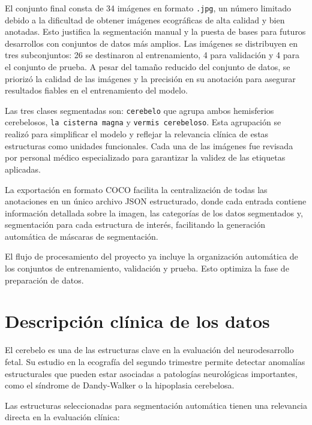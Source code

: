 El conjunto final consta de 34 imágenes en formato \texttt{.jpg}, un número limitado debido a la dificultad de obtener imágenes ecográficas de alta calidad y bien anotadas. Esto justifica la segmentación manual y la puesta de bases para futuros desarrollos con conjuntos de datos más amplios. Las imágenes se distribuyen en tres subconjuntos: 26 se destinaron al entrenamiento, 4 para validación y 4 para el conjunto de prueba. A pesar del tamaño reducido del conjunto de datos, se priorizó la calidad de las imágenes y la precisión en su anotación para asegurar resultados fiables en el entrenamiento del modelo.

Las tres clases segmentadas son: \texttt{cerebelo} que agrupa ambos hemisferios cerebelosos, \texttt{la cisterna magna} y \texttt{vermis cerebeloso}. Esta agrupación se realizó para simplificar el modelo y reflejar la relevancia clínica de estas estructuras como unidades funcionales. Cada una de las imágenes fue revisada por personal médico especializado para garantizar la validez de las etiquetas aplicadas. 

La exportación en formato COCO facilita la centralización de todas las anotaciones en un único archivo JSON estructurado, donde cada entrada contiene información detallada sobre la imagen, las categorías de los datos segmentados y, segmentación para cada estructura de interés, facilitando la generación automática de máscaras de segmentación.

El flujo de procesamiento del proyecto ya incluye la organización automática de los conjuntos de entrenamiento, validación y prueba. Esto optimiza la fase de preparación de datos.
    
\section{Descripción clínica de los datos}

El cerebelo es una de las estructuras clave en la evaluación del neurodesarrollo fetal. Su estudio en la ecografía del segundo trimestre permite detectar anomalías estructurales que pueden estar asociadas a patologías neurológicas importantes, como el síndrome de Dandy-Walker o la hipoplasia cerebelosa.

Las estructuras seleccionadas para segmentación automática tienen una relevancia directa en la evaluación clínica:

